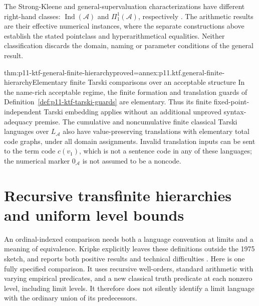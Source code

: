 The Strong-Kleene and general-supervaluation characterizations have
different right-hand classes: \(\operatorname{Ind}(\mathcal A)\)
and \(\Pi^1_1(\mathcal A)\), respectively
\cite[p.~716 and n.~36]{Kripke1975}. The arithmetic results are
their effective numerical instances, where the separate constructions
above establish the stated pointclass and hyperarithmetical equalities.
Neither classification discards the domain, naming or parameter
conditions of the general result.

\begin{hbcorollary}{thm:p11-ktf-general-finite-hierarchy}{proved=annex:p11.ktf.general-finite-hierarchy}{Elementary finite Tarski comparisons over an acceptable structure}
In the name-rich acceptable regime, the finite formation and
translation guards of Definition~\ref{def:p11-ktf-tarski-guards}
are elementary. Thus its finite fixed-point-independent Tarski
embedding applies without an additional unproved syntax-adequacy
premise. The cumulative and noncumulative finite classical Tarski
languages over \(L_{\mathcal A}\) also have value-preserving
translations with elementary total code graphs, under all domain
assignments. Invalid translation inputs can be sent to the term
code \(c(v_1)\), which is not a sentence code in any of these
languages; the numerical marker \(0_{\mathcal A}\) is not
assumed to be a noncode.
\end{hbcorollary}

\section{Recursive transfinite hierarchies and uniform level bounds}

An ordinal-indexed comparison needs both a language convention at
limits and a meaning of equivalence. Kripke explicitly leaves these
definitions outside the 1975 sketch, and reports both positive results
and technical difficulties \cite[pp.~697, 710]{Kripke1975}.
Here is one fully specified comparison. It uses recursive well-orders,
standard arithmetic with varying empirical predicates, and a new
classical truth predicate at each nonzero level, including limit levels.
It therefore does not silently identify a limit language with the
ordinary union of its predecessors.

